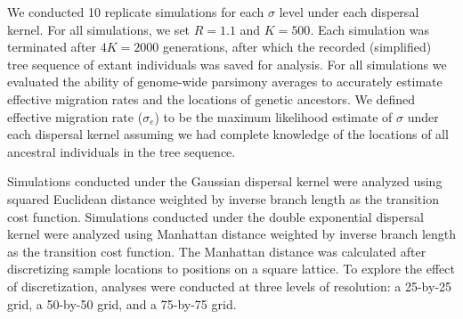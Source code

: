 We conducted 10 replicate simulations for each $\sigma$ level under each 
dispersal kernel. For all simulations, we set $R=1.1$ and $K=500$. Each
simulation was terminated after $4K = 2000$ generations, after which the
recorded (simplified) tree sequence of extant individuals was saved for 
analysis. For all simulations we evaluated the ability of genome-wide parsimony
averages to accurately estimate effective migration rates and the locations of 
genetic ancestors. We defined effective migration rate ($\sigma_e$) to be the
maximum likelihood estimate of $\sigma$ under each dispersal kernel assuming we
had complete knowledge of the locations of all ancestral individuals in the
tree sequence.

Simulations conducted under the Gaussian dispersal kernel were analyzed using
squared Euclidean distance weighted by inverse branch length as the transition
cost function. Simulations conducted under the double exponential dispersal
kernel were analyzed using Manhattan distance weighted by inverse branch length
as the transition cost function. The Manhattan distance was calculated after 
discretizing sample locations to positions on a square lattice. To explore the
effect of discretization, analyses were conducted at three levels of resolution: 
a 25-by-25 grid, a 50-by-50 grid, and a 75-by-75 grid.
